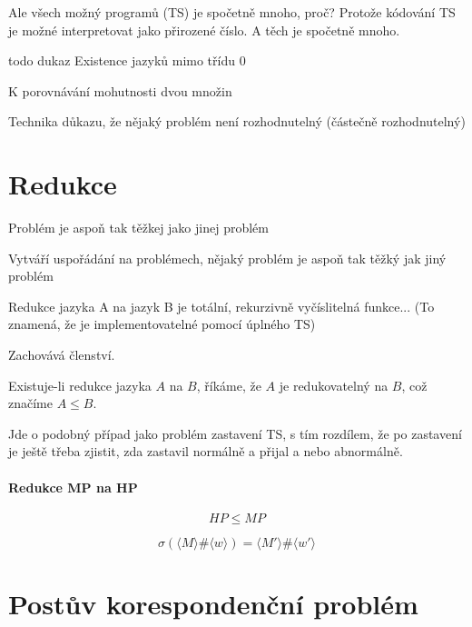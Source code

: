 Ale všech možný programů (TS) je spočetně mnoho, proč? Protože kódování TS je možné interpretovat jako přirozené číslo. A těch je spočetně mnoho.


todo dukaz Existence jazyků mimo třídu 0

K porovnávání mohutnosti dvou množin

Technika důkazu, že nějaký problém není rozhodnutelný (částečně rozhodnutelný)


\section{Redukce}

\begin{compactitem}

    \item Problém je aspoň tak těžkej jako jinej problém

    \item Vytváří uspořádání na problémech, nějaký problém je aspoň tak těžký jak jiný problém

    \item Redukce jazyka A na jazyk B je totální, rekurzivně vyčíslitelná funkce... (To znamená, že je implementovatelné pomocí úplného TS)

    \item Zachovává členství.

    \item Existuje-li redukce jazyka $A$ na $B$, říkáme, že $A$ je redukovatelný na $B$, což značíme $A \leq B$.

\end{compactitem}


Jde o podobný případ jako problém zastavení TS, s tím rozdílem, že po zastavení je ještě třeba zjistit, zda zastavil normálně a přijal a nebo abnormálně.

\paragraph*{Redukce MP na HP}

$$ HP \leq MP $$

$$ \sigma(\langle M \rangle \# \langle w \rangle) = \langle M' \rangle \# \langle w' \rangle$$


\section{Postův korespondenční problém}

